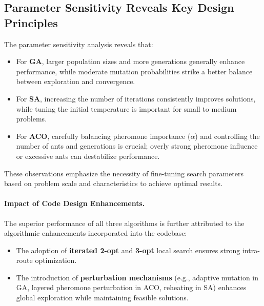\subsection{Parameter Sensitivity Reveals Key Design Principles}
The parameter sensitivity analysis reveals that:
\begin{itemize}
    \item For \textbf{GA}, larger population sizes and more generations generally enhance performance, while moderate mutation probabilities strike a better balance between exploration and convergence.
    \item For \textbf{SA}, increasing the number of iterations consistently improves solutions, while tuning the initial temperature is important for small to medium problems.
    \item For \textbf{ACO}, carefully balancing pheromone importance ($\alpha$) and controlling the number of ants and generations is crucial; overly strong pheromone influence or excessive ants can destabilize performance.
\end{itemize}
These observations emphasize the necessity of fine-tuning search parameters based on problem scale and characteristics to achieve optimal results.

\paragraph{Impact of Code Design Enhancements.}
The superior performance of all three algorithms is further attributed to the algorithmic enhancements incorporated into the codebase:
\begin{itemize}
    \item The adoption of \textbf{iterated 2-opt} and \textbf{3-opt} local search ensures strong intra-route optimization.
    \item The introduction of \textbf{perturbation mechanisms} (e.g., adaptive mutation in GA, layered pheromone perturbation in ACO, reheating in SA) enhances global exploration while maintaining feasible solutions.
\end{itemize}

